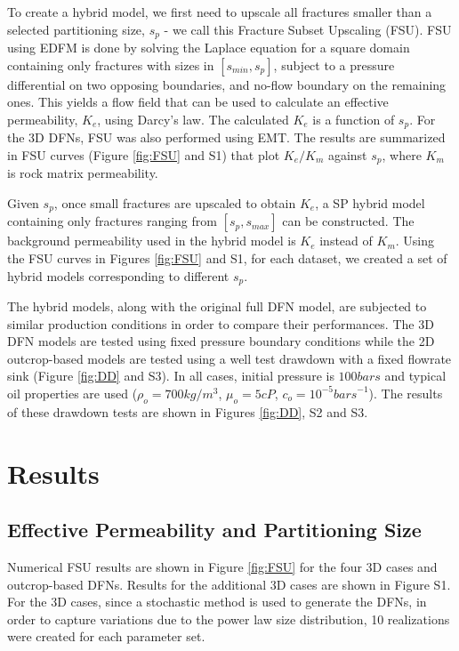 \documentclass[draft]{agujournal2018}
\begin{document}
To create a hybrid model, we first need to upscale all fractures smaller than a selected partitioning size, $s_p$ - we call this Fracture Subset Upscaling (FSU). FSU using EDFM is done by solving the Laplace equation for a square domain containing only fractures with sizes in $[s_{min},s_p]$, subject to a pressure differential on two opposing boundaries, and no-flow boundary on the remaining ones. This yields a flow field that can be used to calculate an effective permeability, $K_{e}$, using Darcy's law. The calculated $K_{e}$ is a function of $s_p$. For the 3D DFNs, FSU was also performed using EMT. The results are summarized in FSU curves (Figure \ref{fig:FSU} and S1) that plot $K_{e}/K_m$ against $s_p$, where $K_m$ is rock matrix permeability.

Given $s_p$, once small fractures are upscaled to obtain $K_e$, a SP hybrid model containing only fractures ranging from $[s_p,s_{max}]$ can be constructed. The background permeability used in the hybrid model is $K_e$ instead of $K_m$. Using the FSU curves in Figures \ref{fig:FSU} and S1, for each dataset, we created a set of hybrid models corresponding to different $s_p$. 

The hybrid models, along with the original full DFN model, are subjected to similar production conditions in order to compare their performances. The 3D DFN models are tested using fixed pressure boundary conditions while the 2D outcrop-based models are tested using a well test drawdown with a fixed flowrate sink (Figure \ref{fig:DD} and S3). In all cases, initial pressure is $100 bars$ and typical oil properties are used ($\rho_o=700 kg/m^3$, $\mu_o=5 cP$, $c_o=10^{-5} {bars}^{-1}$). The results of these drawdown tests are shown in Figures \ref{fig:DD}, S2 and S3.

\section{Results}
\subsection{Effective Permeability and Partitioning Size}
Numerical FSU results are shown in Figure \ref{fig:FSU} for the four 3D cases and outcrop-based DFNs. Results for the additional 3D cases are shown in Figure S1. For the 3D cases, since a stochastic method is used to generate the DFNs, in order to capture variations due to the power law size distribution, 10 realizations were created for each parameter set. 
\end{document}
